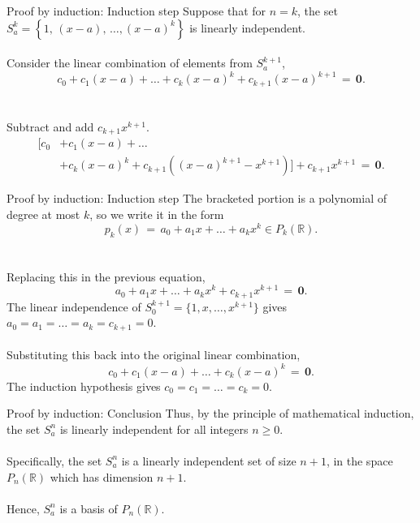 \documentclass{beamer}
\begin{document}
        \begin{frame}{Proof by induction: Induction step}
                Suppose that for $n = k$, the set $S_a^k = \left\{1,\, (x - a),\, \dots, (x - a)^k\right\}$ is linearly independent. \\~\\
                \pause
                Consider the linear combination of elements from $S_a^{k + 1}$,
                \[
                        c_0 + c_1(x - a) + \dots + c_k(x - a)^k + c_{k + 1}(x - a)^{k + 1} \,=\, \mathbf{0}.
                \]\\~\\
                \pause Subtract and add $c_{k + 1}x^{k + 1}$.
                \begin{align*}
                        \Big[c_0 &+ c_1(x - a) + \dots  \\
                        &+ c_k(x - a)^k + c_{k + 1}\left((x - a)^{k + 1} - x^{k + 1}\right)\Big] + c_{k + 1}x^{k + 1} \,=\, \mathbf{0}.
                \end{align*}
        \end{frame}

        \begin{frame}{Proof by induction: Induction step}
                The bracketed portion is a polynomial of degree at most $k$, so we write it in the form
                \[
                        p_k(x) \,=\, a_0 + a_1x + \dots + a_kx^k \in P_k(\mathbb{R}).
                \]\\~\\
                \pause
                Replacing this in the previous equation,
                \[
                        a_0 + a_1x + \dots + a_kx^k + c_{k + 1}x^{k + 1} \,=\, \mathbf{0}.
                \]
                The linear independence of $S_0^{k + 1} = \{1, x, \dots, x^{k + 1}\}$ gives $a_0 = a_1 = \dots = a_k = c_{k + 1} = 0$. \\~\\
                \pause
                Substituting this back into the original linear combination,
                \[
                        c_0 + c_1(x - a) + \dots + c_k(x - a)^k \,=\, \mathbf{0}.
                \]
                The induction hypothesis gives $c_0 = c_1 = \dots = c_k = 0$.
        \end{frame}

        \begin{frame}{Proof by induction: Conclusion}
                Thus, by the principle of mathematical induction, the set $S_a^n$ is linearly independent for all integers $n \geq 0$. \\~\\

                Specifically, the set $S_a^n$ is a linearly independent set of size $n + 1$, in the space $P_n(\mathbb{R})$ which has dimension
                $n + 1$. \\~\\

                Hence, $S_a^n$ is a basis of $P_n(\mathbb{R})$.
        \end{frame}
\end{document}

